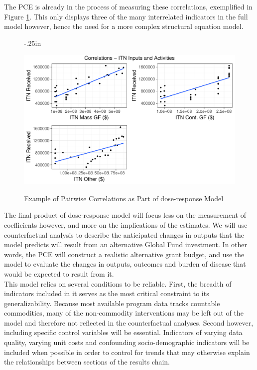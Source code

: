 \documentclass[twocolumn]{bmcart}%
\begin{document}
The PCE is already in the process of measuring these correlations, exemplified in Figure \ref{fig3}. This only displays three of the many interrelated indicators in the full model however, hence the need for a more complex structural equation model. \\

\begin{figure}[h]
  \advance\leftskip-.25in
  \caption{\textmd{Example of Pairwise Correlations as Part of dose-response Model}}
  \includegraphics[scale=.375]{Pages_from_pilot_data_exploratory_graphs.pdf} \\
  \label{fig3}
\end{figure}

The final product of dose-response model will focus less on the measurement of coefficients however, and more on the implications of the estimates. We will use counterfactual analysis to describe the anticipated changes in outputs that the model predicts will result from an alternative Global Fund investment. In other words, the PCE will construct a realistic alternative grant budget, and use the model to evaluate the changes in outputs, outcomes and burden of disease that would be expected to result from it. \\

This model relies on several conditions to be reliable. First, the breadth of indicators included in it serves as the most critical constraint to its generalizability. Because most available program data tracks countable commodities, many of the non-commodity interventions may be left out of the model and therefore not reflected in the counterfactual analyses. Second however, including specific control variables will be essential. Indicators of varying data quality, varying unit costs and confounding socio-demographic indicators will be included when possible in order to control for trends that may otherwise explain the relationships between sections of the results chain. \\
\end{document}
